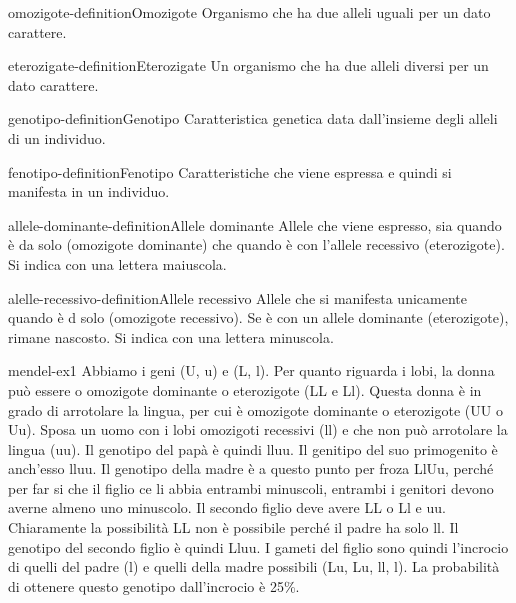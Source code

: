 \documentclass[preview]{standalone}
\begin{document}
\begin{snippetdefinition}{omozigote-definition}{Omozigote}
    Organismo che ha due alleli uguali per un dato carattere.
\end{snippetdefinition}

\begin{snippetdefinition}{eterozigate-definition}{Eterozigate}
    Un organismo che ha due alleli diversi per un dato carattere.
\end{snippetdefinition}

\begin{snippetdefinition}{genotipo-definition}{Genotipo}
    Caratteristica genetica data dall'insieme degli alleli di un individuo.
\end{snippetdefinition}

\begin{snippetdefinition}{fenotipo-definition}{Fenotipo}
    Caratteristiche che viene espressa e quindi si manifesta in un individuo.
\end{snippetdefinition}

\begin{snippetdefinition}{allele-dominante-definition}{Allele dominante}
    Allele che viene espresso, sia quando è da solo (omozigote dominante) che
    quando è con l'allele recessivo (eterozigote). Si indica con una lettera maiuscola.
\end{snippetdefinition}

\begin{snippetdefinition}{alelle-recessivo-definition}{Allele recessivo}
    Allele che si manifesta unicamente quando è d solo (omozigote recessivo).
    Se è con un allele dominante (eterozigote), rimane nascosto. Si indica con una lettera minuscola.
\end{snippetdefinition}


\begin{snippetexercise}{mendel-ex1}{}
    Abbiamo i geni (U, u) e (L, l).
    Per quanto riguarda i lobi, la donna può essere o omozigote dominante o eterozigote
    (LL e Ll). Questa donna è in grado di arrotolare la lingua, per cui è
    omozigote dominante o eterozigote (UU o Uu).
    Sposa un uomo con i lobi omozigoti recessivi (ll) e che non può arrotolare la lingua
    (uu). Il genotipo del papà è quindi lluu. Il genitipo del suo primogenito 
    è anch'esso lluu.
    Il genotipo della madre è a questo punto per froza LlUu, perché
    per far si che il figlio ce li abbia entrambi minuscoli, entrambi
    i genitori devono averne almeno uno minuscolo.
    Il secondo figlio deve avere LL o Ll e uu. Chiaramente la possibilità
    LL non è possibile perché il padre ha solo ll.
    Il genotipo del secondo figlio è quindi Lluu.
    I gameti del figlio sono quindi l'incrocio di quelli del padre (l)
    e quelli della madre possibili (Lu, Lu, ll, l).
    La probabilità di ottenere questo genotipo dall'incrocio è 25\%.
\end{snippetexercise}
\end{document}

